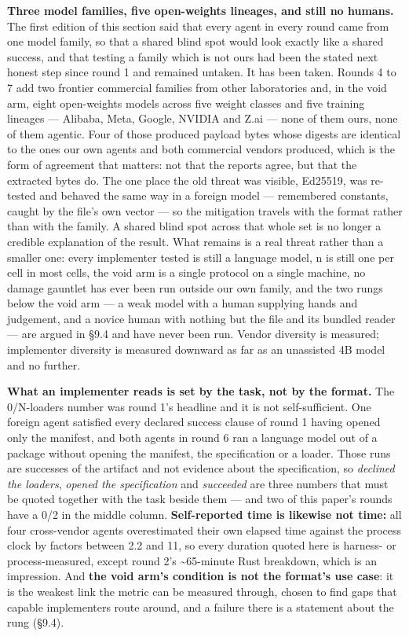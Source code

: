 \documentclass[10pt,twocolumn,letterpaper]{article}
\begin{document}
\textbf{Three model families, five open-weights lineages, and still no humans.} The first edition of this section said that every agent in every round came from one model family, so that a shared blind spot would look exactly like a shared success, and that testing a family which is not ours had been the stated next honest step since round 1 and remained untaken. It has been taken. Rounds 4 to 7 add two frontier commercial families from other laboratories and, in the void arm, eight open-weights models across five weight classes and five training lineages --- Alibaba, Meta, Google, NVIDIA and Z.ai --- none of them ours, none of them agentic. Four of those produced payload bytes whose digests are identical to the ones our own agents and both commercial vendors produced, which is the form of agreement that matters: not that the reports agree, but that the extracted bytes do. The one place the old threat was visible, Ed25519, was re-tested and behaved the same way in a foreign model --- remembered constants, caught by the file's own vector --- so the mitigation travels with the format rather than with the family. A shared blind spot across that whole set is no longer a credible explanation of the result. What remains is a real threat rather than a smaller one: every implementer tested is still a language model, n is still one per cell in most cells, the void arm is a single protocol on a single machine, no damage gauntlet has ever been run outside our own family, and the two rungs below the void arm --- a weak model with a human supplying hands and judgement, and a novice human with nothing but the file and its bundled reader --- are argued in \S9.4 and have never been run. Vendor diversity is measured; implementer diversity is measured downward as far as an unassisted 4B model and no further.

\textbf{What an implementer reads is set by the task, not by the format.} The 0/N-loaders number was round 1's headline and it is not self-sufficient. One foreign agent satisfied every declared success clause of round 1 having opened only the manifest, and both agents in round 6 ran a language model out of a package without opening the manifest, the specification or a loader. Those runs are successes of the artifact and not evidence about the specification, so \emph{declined the loaders}, \emph{opened the specification} and \emph{succeeded} are three numbers that must be quoted together with the task beside them --- and two of this paper's rounds have a 0/2 in the middle column. \textbf{Self-reported time is likewise not time:} all four cross-vendor agents overestimated their own elapsed time against the process clock by factors between 2.2 and 11, so every duration quoted here is harness- or process-measured, except round 2's \textasciitilde{}65-minute Rust breakdown, which is an impression. And \textbf{the void arm's condition is not the format's use case}: it is the weakest link the metric can be measured through, chosen to find gaps that capable implementers route around, and a failure there is a statement about the rung (\S9.4).
\end{document}
